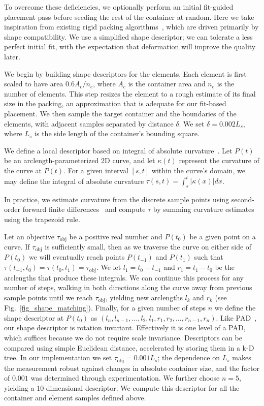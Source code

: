 To overcome these deficiencies, we optionally perform an initial fit-guided
placement pass before seeding the rest of the container at random. 
Here we take inspiration from existing rigid packing 
algorithms~\cite{Kwan2016}, which are driven primarily by shape 
compatibility.  We use a simplified shape descriptor; we can tolerate
a less perfect initial fit, with the expectation that deformation will
improve the quality later.

We begin by building shape descriptors for the elements.  
Each element is first scaled to have area
$0.6A_c/n_e$, where $A_c$ is the container area and $n_e$ is the 
number of elements.  This step resizes the element to a rough estimate
of its final size in the packing, an approximation that is adequate
for our fit-based placement.  We then sample the target container and
the boundaries of the elements, with adjacent samples separated by
distance $\delta$.  We set $\delta=0.002L_s$, where $L_s$ is the
side length of the container's bounding square.

We define a local descriptor based on integral of absolute curvature~\cite{Cui2009,Kwan2016}.
Let $P(t)$ be an arclength-parameterized 2D curve, and let $\kappa(t)$ represent the curvature of the curve at $P(t)$.  For a given interval $[s,t]$ within the curve's domain, we may define the integral of absolute curvature
$\tau(s,t) = \int_{s}^{t} | \kappa(x) | dx$.

In practice, we estimate curvature from the discrete sample points
using second-order forward finite differences~\cite{Banchoff} 
and compute $\tau$ by summing curvature estimates using the trapezoid rule.

Let an objective $\tau_\mathrm{obj}$ be a positive real number and $P(t_0)$ be a given point on a curve.  If $\tau_\mathrm{obj}$ is sufficiently small, then as we traverse the curve on either side of $P(t_0)$ we will eventually reach points $P(t_{-1})$ and $P(t_1)$ such that $\tau(t_{-1},t_0)=\tau(t_0,t_1)=\tau_\mathrm{obj}$.  We let $l_1=t_0-t_{-1}$ and $r_1=t_1-t_0$ be the arclengths that produce these integrals.  We can continue this process for any number of steps, walking in both directions along the curve away from previous sample points until we reach $\tau_\mathrm{obj}$, yielding new arclengths $l_k$ and $r_k$ (see Fig.~\ref{fig_shape_matching}).  Finally, for a given number of steps $n$ we define the shape descriptor at $P(t_0)$ as
$(l_n, l_{n-1}, \ldots, l_2, l_1, r_1, r_2, \ldots, r_{n-1}, r_n)$.
Like PAD~\cite{Kwan2016}, our shape descriptor is rotation 
invariant.  Effectively it is one level of a PAD, which suffices because
we do not require scale invariance.
Descriptors can be compared using simple Euclidean distance, accelerated
by storing them in a k-D tree.
In our implementation we set $\tau_\mathrm{obj}=0.001L_s$; the dependence
on $L_s$ makes the measurement robust against changes in absolute container
size, and the factor of $0.001$ was determined through experimentation.
We further choose $n=5$, yielding a 10-dimensional descriptor. We compute
this descriptor for all the container and element samples defined above.

